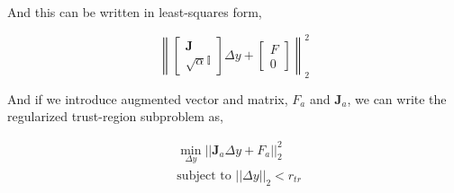 And this can be written in least-squares form,

\begin{equation}
    \left\lVert \begin{bmatrix}
        \mathbf{J} \\ \sqrt{\alpha} \mathbb{I}
    \end{bmatrix} \Delta y + \begin{bmatrix}
        F \\ 0
    \end{bmatrix} \right\rVert_2^2
\end{equation}

And if we introduce augmented vector and matrix, $F_a$ and $\mathbf{J}_a$, we can write the regularized trust-region subproblem as,

\begin{align*}
    &\min_{\Delta y} ||\mathbf{J}_a\Delta y + F_a||_2^2 \\
    &\text{subject to } ||\Delta y||_2<r_{tr}
\end{align*}
